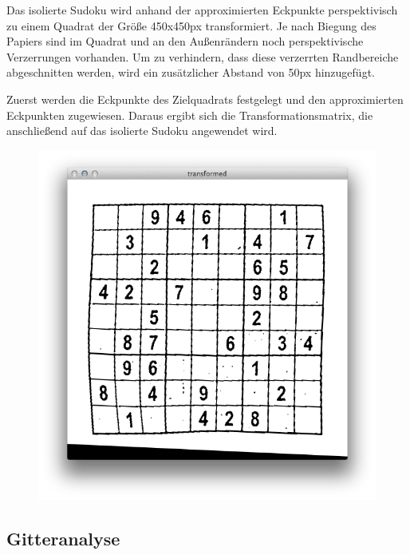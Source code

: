 Das isolierte Sudoku wird anhand der approximierten Eckpunkte perspektivisch zu einem Quadrat der Größe 450x450px transformiert.
Je nach Biegung des Papiers sind im Quadrat und an den Außenrändern noch perspektivische Verzerrungen vorhanden. Um zu verhindern, dass diese verzerrten Randbereiche abgeschnitten werden, wird ein zusätzlicher Abstand von 50px hinzugefügt.

Zuerst werden die Eckpunkte des Zielquadrats festgelegt und den approximierten Eckpunkten zugewiesen. Daraus ergibt sich die Transformationsmatrix, die anschließend auf das isolierte Sudoku angewendet wird.

\begin{figure}[h!]
    \begin{center}
        \includegraphics[width=.5\textwidth]{Abbildungen/transformed}
    \end{center}
\end{figure}


\subsection{Gitteranalyse}

